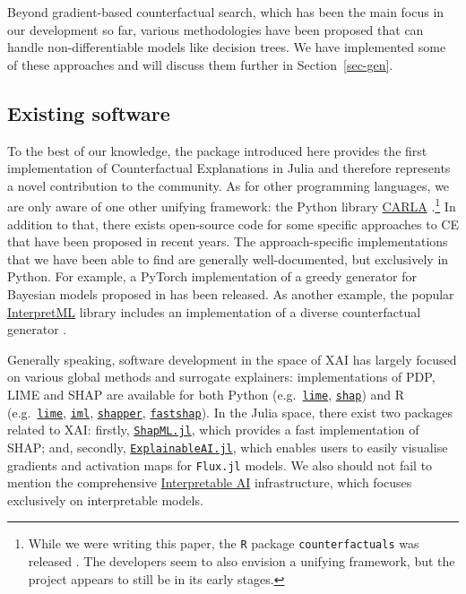 \documentclass{juliacon}
\begin{document}
Beyond gradient-based counterfactual search, which has been the main
focus in our development so far, various methodologies have been
proposed that can handle non-differentiable models like decision trees.
We have implemented some of these approaches and will discuss them
further in Section~\ref{sec-gen}.

\hypertarget{existing-software}{%
\subsection{Existing software}\label{existing-software}}

To the best of our knowledge, the package introduced here provides the
first implementation of Counterfactual Explanations in Julia and
therefore represents a novel contribution to the community. As for other
programming languages, we are only aware of one other unifying
framework: the Python library
\href{https://carla-counterfactual-and-recourse-library.readthedocs.io/en/latest/?badge=latest}{CARLA}
\autocite{pawelczyk2021carla}.\footnote{While we were writing this
  paper, the \texttt{R} package \texttt{counterfactuals} was released
  \autocite{dandl2023counterfactuals}. The developers seem to also
  envision a unifying framework, but the project appears to still be in
  its early stages.} In addition to that, there exists open-source code
for some specific approaches to CE that have been proposed in recent
years. The approach-specific implementations that we have been able to
find are generally well-documented, but exclusively in Python. For
example, a PyTorch implementation of a greedy generator for Bayesian
models proposed in \textcite{schut2021generating} has been released. As
another example, the popular
\href{https://github.com/interpretml}{InterpretML} library includes an
implementation of a diverse counterfactual generator
\autocite{mothilal2020explaining}.

Generally speaking, software development in the space of XAI has largely
focused on various global methods and surrogate explainers:
implementations of PDP, LIME and SHAP are available for both Python
(e.g.~\href{https://github.com/marcotcr/lime}{\texttt{lime}},
\href{https://github.com/slundberg/shap}{\texttt{shap}}) and R
(e.g.~\href{https://cran.r-project.org/web/packages/lime/index.html}{\texttt{lime}},
\href{https://cran.r-project.org/web/packages/lime/index.html}{\texttt{iml}},
\href{https://modeloriented.github.io/shapper/}{\texttt{shapper}},
\href{https://github.com/bgreenwell/fastshap}{\texttt{fastshap}}). In
the Julia space, there exist two packages related to XAI: firstly,
\href{https://github.com/nredell/ShapML.jl}{\texttt{ShapML.jl}}, which
provides a fast implementation of SHAP; and, secondly,
\href{https://github.com/adrhill/ExplainableAI.jl}{\texttt{ExplainableAI.jl}},
which enables users to easily visualise gradients and activation maps
for \texttt{Flux.jl} models. We also should not fail to mention the
comprehensive
\href{https://docs.interpretable.ai/stable/IAIBase/data/}{Interpretable
AI} infrastructure, which focuses exclusively on interpretable models.
\end{document}
